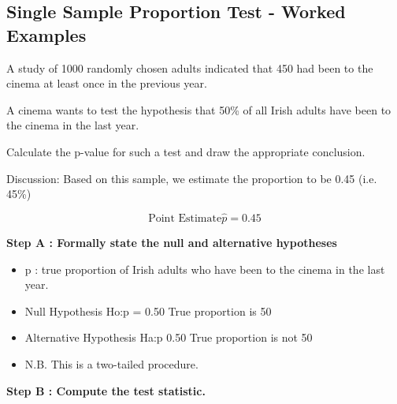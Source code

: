 %		
%			
%			
%			
%			




\subsection{ Single Sample Proportion Test - Worked Examples}

A study of 1000 randomly chosen adults indicated that 450 had been to the cinema at least once in the previous year.

A cinema wants to test the hypothesis that 50\% of all Irish adults have been to the cinema in the last year.

Calculate the p-value for such a test and draw the appropriate conclusion.

Discussion: Based on this sample, we estimate the proportion to be 0.45  (i.e. 45\%)

\[ \mbox{Point Estimate} \hat{p} = 0.45\]

\noindent \textbf{Step A : Formally state the null and alternative hypotheses}

\begin{itemize}
	\item p : true proportion of Irish adults who have been to the cinema in the last year.
	
	\item	Null Hypothesis               Ho:p = 0.50        True proportion is 50%
	
	\item Alternative Hypothesis      Ha:p 0.50        True proportion is not 50%
	
	
	\item	N.B. This is a two-tailed procedure.
\end{itemize}




\noindent \textbf{Step B : Compute the test statistic.}

